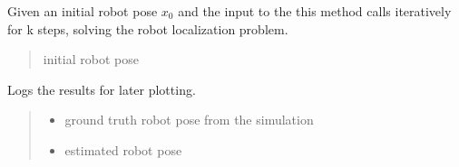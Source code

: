 \documentclass[letterpaper,10pt,english]{sphinxmanual}
\begin{document}
\begin{fulllineitems}
\begin{fulllineitems}
\begin{quote}
\begin{description}
\end{description}\end{quote}

\end{fulllineitems}


\begin{fulllineitems}
\label{\detokenize{Localization:Localization.Localization.LocalizationLoop}}
\pysigstartsignatures
{}
\pysigstopsignatures
\sphinxAtStartPar
Given an initial robot pose \(x_0\) and the input to the  this method calls iteratively  for k steps, solving the robot localization problem.
\begin{quote}\begin{description}
\sphinxAtStartPar
{} \textendash{} initial robot pose

\end{description}\end{quote}

\end{fulllineitems}


\begin{fulllineitems}
\label{\detokenize{Localization:Localization.Localization.Log}}
\pysigstartsignatures
{}
\pysigstopsignatures
\sphinxAtStartPar
Logs the results for later plotting.
\begin{quote}\begin{description}
\begin{itemize}
\item {} 
\sphinxAtStartPar
{} \textendash{} ground truth robot pose from the simulation

\item {} 
\sphinxAtStartPar
{} \textendash{} estimated robot pose


\end{itemize}
\end{description}
\end{quote}
\end{fulllineitems}
\end{fulllineitems}
\end{document}
